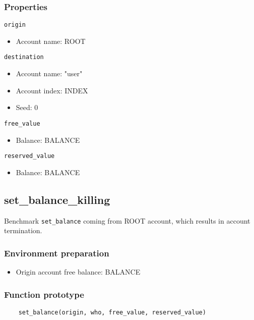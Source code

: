 \documentclass[11pt,a4paper]{article}
\begin{document}
\subsubsection*{Properties}
\verb|origin|
\begin{itemize}
\item Account name: ROOT
\end{itemize}
\verb|destination|
\begin{itemize}
\item Account name: "user"
\item Account index: INDEX
\item Seed: 0
\end{itemize}
\verb|free_value|
\begin{itemize}
\item Balance: BALANCE
\end{itemize}
\verb|reserved_value|
\begin{itemize}
\item Balance: BALANCE
\end{itemize}

\subsection{set\_balance\_killing}

Benchmark \verb|set_balance| coming from ROOT account, which results in account termination.

\subsubsection*{Environment preparation}
\begin{itemize}
    \item Origin account free balance: BALANCE
\end{itemize}

\subsubsection*{Function prototype}
\begin{verbatim}
    set_balance(origin, who, free_value, reserved_value)
\end{verbatim}
\end{document}
